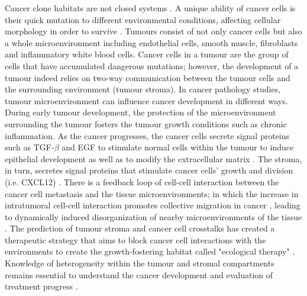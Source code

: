 Cancer clone habitats are not closed systems \cite{greaves2012clonal}. A unique ability of cancer cells is their quick mutation to different environmental conditions, affecting cellular morphology in order to survive \cite{clark2015modes}. Tumours consist of not only cancer cells but also a whole microenvironment including endothelial cells, smooth muscle, fibroblasts and inflammatory white blood cells. Cancer cells in a tumour are the group of cells that have accumulated dangerous mutations; however, the development of a tumour indeed relies on two-way communication between the tumour cells and the surrounding environment (tumour stroma). In cancer pathology studies, tumour microenvironment can influence cancer development in different ways. During early tumour development, the protection of the microenvironment surrounding the tumour fosters the tumour growth conditions such as chronic inflammation. As the cancer progresses, the cancer cells secrete signal proteins such as TGF-$\beta$ and EGF to stimulate normal cells within the tumour to induce epithelial development as well as to modify the extracellular matrix \cite{beck2011systematic,BREMNES2011209}. The stroma, in turn, secretes signal proteins that stimulate cancer cells' growth and division (i.e. CXCL12) \cite{kumar2018analysis,wang2017role}. There is a feedback loop of cell-cell interaction between the cancer cell metastasis and the tissue microenvironments; in which the increase in intratumoral cell-cell interaction promotes collective migration in cancer \cite{friedl2011cancer, whiteside2008tumor}, leading to dynamically induced disorganization of nearby microenvironments of the tissue \cite{friedl2012classifying, canel2013cadherin, almendro2013cellular, roussos2011chemotaxis, zervantonakis2012three}. The prediction of tumour stroma and cancer cell crosstalks has created a therapeutic strategy that aims to block cancer cell interactions with the environments to create the growth-fostering habitat called "ecological therapy" \cite{pienta2008ecological, calabrese2007perivascular, bissell2011don}. Knowledge of heterogeneity within the tumour and stromal compartments remains essential to understand the cancer development and evaluation of treatment progress \cite{pages2010immune}.

